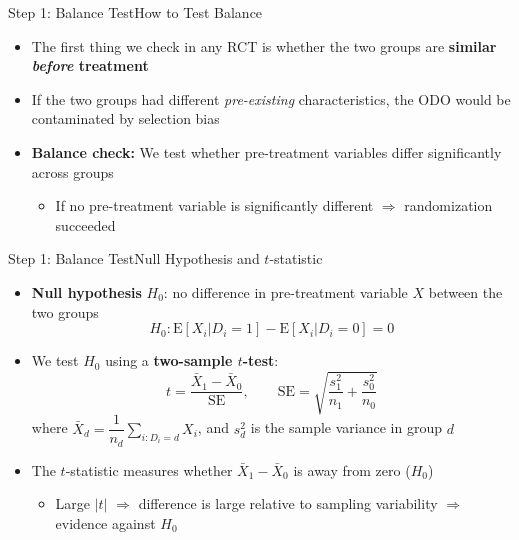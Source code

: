 \documentclass[hyperref={pdfpagelabels=false}]{beamer}
\begin{document}
	\begin{frame}{Step 1: Balance Test}{How to Test Balance}
	\begin{itemize}
		\item The first thing we check in any RCT is whether the two groups are \textbf{similar \emph{before} treatment}
		\vspace{0.2cm}
		\item If the two groups had different \emph{pre-existing} characteristics, the ODO would be contaminated by selection bias
		\vspace{0.2cm}
		\item \textbf{Balance check:} We test whether pre-treatment variables differ significantly across groups
		\vspace{0.2cm}
		\begin{itemize}
			\item If no pre-treatment variable is significantly different $\Rightarrow$ randomization succeeded
		\end{itemize}
	\end{itemize}
\end{frame}



\begin{frame}{Step 1: Balance Test}{Null Hypothesis and $t$-statistic}
	\begin{itemize}
		\item \textbf{Null hypothesis} $H_0$: no difference in pre-treatment variable $X$ between the two groups
		\begin{equation*}
			H_0: \mathrm{E}[X_i | D_i = 1] - \mathrm{E}[X_i | D_i = 0] = 0
		\end{equation*}
		\item We test $H_0$ using a \textbf{two-sample $t$-test}:
		\begin{equation*}
			t = \frac{\bar{X}_1 - \bar{X}_0}{\mathrm{SE}}, \qquad
			\mathrm{SE} = \sqrt{\frac{s_1^2}{n_1}+\frac{s_0^2}{n_0}}
		\end{equation*}
		where $\bar{X}_d = \dfrac{1}{n_d}\displaystyle\sum_{i:D_i=d} X_i$, and $s_d^2$ is the sample variance in group $d$
		\vspace{0.2cm}
		\item The $t$-statistic measures whether $\bar{X}_1 - \bar{X}_0$ is away from zero ($H_0$)
		\vspace{0.1cm}
		\begin{itemize}
			\item Large $|t|$ $\Rightarrow$ difference is large relative to sampling variability $\Rightarrow$ evidence against $H_0$
		\end{itemize}
	\end{itemize}
\end{frame}
\end{document}
